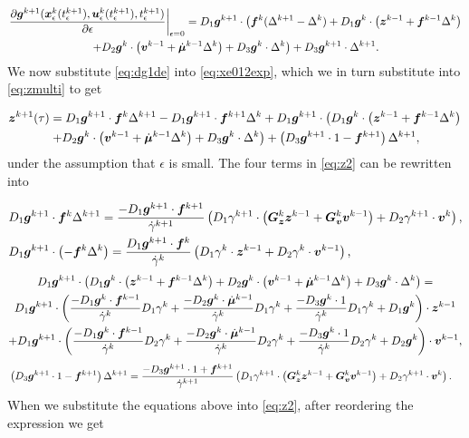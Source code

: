 \documentclass[../DC2017114Bouma.tex]{subfiles}
\begin{document}
\begin{multline}
\left.\frac{\partial{\boldsymbol{g}}^{k+1}({\boldsymbol{x}}^{k}_\epsilon(t_\epsilon^{k+1}),{\boldsymbol{u}}^{k}_\epsilon(t_\epsilon^{k+1}),t_\epsilon^{k+1})}{\partial\epsilon}\right|_{\epsilon=0} = D_1{\boldsymbol{g}}^{k+1}\cdot\left({\boldsymbol{f}}^{k}(\Delta^{k+1}-\Delta^{k}) + D_1{\boldsymbol{g}}^{k}\cdot\left({\boldsymbol{z}}^{k-1}+{\boldsymbol{f}}^{k-1}\Delta^{k}\right)\right. \\ \left.+ D_2{\boldsymbol{g}}^{k}\cdot\left({\boldsymbol{v}}^{k-1}+\dot{\boldsymbol{\mu}}^{k-1}\Delta^{k}\right) + D_3{\boldsymbol{g}}^{k}\cdot\Delta^{k}\right)+D_3{\boldsymbol{g}}^{k+1}\cdot\Delta^{k+1}. \label{eq:dg1de}
\end{multline}
We now substitute \eqref{eq:dg1de} into \eqref{eq:xe012exp}, which we in turn substitute into \eqref{eq:zmulti} to get

\begin{multline}
{\boldsymbol{z}}^{k+1}(\tau) = D_1{\boldsymbol{g}}^{k+1}\cdot{\boldsymbol{f}}^{k}\Delta^{k+1} - D_1{\boldsymbol{g}}^{k+1}\cdot{\boldsymbol{f}}^{k+1}\Delta^{k} + D_1{\boldsymbol{g}}^{k+1}\cdot\left(D_1{\boldsymbol{g}}^{k}\cdot\left({\boldsymbol{z}}^{k-1}+{\boldsymbol{f}}^{k-1}\Delta^{k}\right)\right.\\
\left.+D_2{\boldsymbol{g}}^{k}\cdot\left({\boldsymbol{v}}^{k-1}+\dot{\boldsymbol{\mu}}^{k-1}\Delta^{k}\right)+D_3{\boldsymbol{g}}^{k}\cdot\Delta^{k}\right) + \left(D_3{\boldsymbol{g}}^{k+1}\cdot 1 - {\boldsymbol{f}}^{k+1}\right)\Delta^{k+1},\label{eq:z2}
\end{multline}
under the assumption that $\epsilon$ is small. The four terms in \eqref{eq:z2} can be rewritten into

\begin{align}
&D_1{\boldsymbol{g}}^{k+1}\cdot{\boldsymbol{f}}^{k}\Delta^{k+1} = \frac{-D_1{\boldsymbol{g}}^{k+1}\cdot{\boldsymbol{f}}^{k+1}}{\dot{\gamma}^{k+1}}\left(D_1\gamma^{k+1}\cdot\left({\boldsymbol{G}}_{\boldsymbol{z}}^{k}{\boldsymbol{z}}^{k-1}+{\boldsymbol{G}}_{\boldsymbol{v}}^{k}{\boldsymbol{v}}^{k-1}\right) +D_2\gamma^{k+1}\cdot{\boldsymbol{v}}^{k}\right),\\
&D_1{\boldsymbol{g}}^{k+1}\cdot\left(-{\boldsymbol{f}}^{k}\Delta^{k}\right) = \frac{D_1{\boldsymbol{g}}^{k+1}\cdot{\boldsymbol{f}}^{k}}{\dot{\gamma}^{k}}\left(D_1\gamma^{k}\cdot{\boldsymbol{z}}^{k-1} + D_2\gamma^{k}\cdot{\boldsymbol{v}}^{k-1}\right),
\end{align}
\begin{multline}
D_1{\boldsymbol{g}}^{k+1}\cdot\left(D_1{\boldsymbol{g}}^{k}\cdot\left({\boldsymbol{z}}^{k-1} + {\boldsymbol{f}}^{k-1}\Delta^{k}\right) + D_2{\boldsymbol{g}}^{k}\cdot\left({\boldsymbol{v}}^{k-1}+\dot{\boldsymbol{\mu}}^{k-1}\Delta^{k}\right) + D_3{\boldsymbol{g}}^{k}\cdot\Delta^{k}\right) = \\
D_1{\boldsymbol{g}}^{k+1}\cdot\left(\frac{-D_1{\boldsymbol{g}}^{k}\cdot{\boldsymbol{f}}^{k-1}}{\dot{\gamma}^{k}}D_1\gamma^{k} + \frac{-D_2{\boldsymbol{g}}^{k}\cdot\dot{\boldsymbol{\mu}}^{k-1}}{\dot{\gamma}^{k}}D_1\gamma^{k} + \frac{-D_3{\boldsymbol{g}}^{k}\cdot 1}{\dot{\gamma}^{k}}D_1\gamma^{k} + D_1{\boldsymbol{g}}^{k}\right)\cdot{\boldsymbol{z}}^{k-1} \\
+ D_1{\boldsymbol{g}}^{k+1}\cdot\left(\frac{-D_1{\boldsymbol{g}}^{k}\cdot{\boldsymbol{f}}^{k-1}}{\dot{\gamma}^{k}}D_2\gamma^{k} + \frac{-D_2{\boldsymbol{g}}^{k}\cdot\dot{\boldsymbol{\mu}}^{k-1}}{\dot{\gamma}^{k}}D_2\gamma^{k} + \frac{-D_3{\boldsymbol{g}}^{k}\cdot 1}{\dot{\gamma}^{k}}D_2\gamma^{k} + D_2{\boldsymbol{g}}^{k} \right)\cdot {\boldsymbol{v}}^{k-1},
\end{multline}
\begin{align}
&\left(D_3{\boldsymbol{g}}^{k+1}\cdot 1 - {\boldsymbol{f}}^{k+1}\right)\Delta^{k+1} = \frac{-D_3{\boldsymbol{g}}^{k+1}\cdot 1+{\boldsymbol{f}}^{k+1}}{\dot{\gamma}^{k+1}}\left(D_1\gamma^{k+1}\cdot\left({\boldsymbol{G}}_{\boldsymbol{z}}^{k}{\boldsymbol{z}}^{k-1} + {\boldsymbol{G}}_{\boldsymbol{v}}^{k}{\boldsymbol{v}}^{k-1}\right) + D_2\gamma^{k+1}\cdot{\boldsymbol{v}}^{k}\right).
\end{align}
%
When we substitute the equations above into \eqref{eq:z2}, after reordering the expression we get
\end{document}
